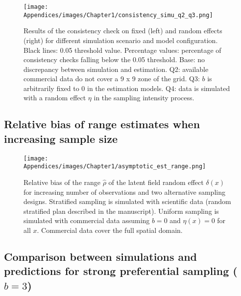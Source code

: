 \newpage

\begin{figure}[H]
   \begin{center}
      \texttt{[image: Appendices/images/Chapter1/consistency\_simu\_q2\_q3.png]}
   \end{center}
   \caption[Results of the consistency check on fixed (left) and random effects (right) for different simulation scenario and model configuration.]
   {Results of the consistency check on fixed (left) and random effects (right) for different simulation scenario and model configuration. Black lines: 0.05 threshold value. Percentage values: percentage of consistency checks falling below the 0.05 threshold. Base: no discrepancy between simulation and estimation. Q2: available commercial data do not cover a 9 x 9 zone of the grid. Q3: \(b\) is arbitrarily fixed to 0 in the estimation models. Q4: data is simulated with a random effect \(\eta\) in the sampling intensity process.}
   \label{fig:PvalSimu2}
\end{figure}

\clearpage

\subsection{Relative bias of range estimates when increasing sample size}\label{appendix:BiasRange}

\begin{figure}[H]
   \begin{center}
      \texttt{[image: Appendices/images/Chapter1/asymptotic\_est\_range.png]}
   \end{center}
   \caption[Relative bias of the range \(\hat \rho\) of the latent field random effect \(\delta(x)\) for increasing number of observations and two alternative sampling designs.]
   {Relative bias of the range \(\hat \rho\) of the latent field random effect \(\delta(x)\) for increasing number of observations and two alternative sampling designs. Stratified sampling is simulated with scientific data (random stratified plan described in the manuscript). Uniform sampling is simulated with commercial data assuming \(b=0\) and \(\eta(x)=0\) for all $x$. Commercial data cover the full spatial domain.}
   \label{fig:BiasRange}
\end{figure}

\clearpage

\subsection{Comparison between simulations and predictions for strong preferential sampling (\(b=3\))}\label{appendix:StrongPS}

